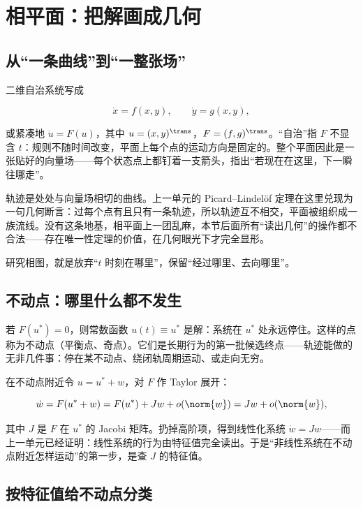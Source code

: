 \section{相平面：把解画成几何}

\subsection{从``一条曲线''到``一整张场''}

二维自治系统写成

\[
\dot x=f(x,y),
\qquad
\dot y=g(x,y),
\]

或紧凑地 \(\dot u=F(u)\)，其中 \(u=(x,y)^{\trans}\)，\(F=(f,g)^{\trans}\)。``自治''指 \(F\) 不显含 \(t\)：规则不随时间改变，平面上每个点的运动方向是固定的。整个平面因此是一张贴好的向量场——每个状态点上都钉着一支箭头，指出``若现在在这里，下一瞬往哪走''。

轨迹是处处与向量场相切的曲线。上一单元的 Picard--Lindelöf 定理在这里兑现为一句几何断言：过每个点有且只有一条轨迹，所以轨迹互不相交，平面被组织成一族流线。没有这条地基，相平面上一团乱麻，本节后面所有``读出几何''的操作都不合法——存在唯一性定理的价值，在几何眼光下才完全显形。

研究相图，就是放弃``\(t\) 时刻在哪里''，保留``经过哪里、去向哪里''。

\subsection{不动点：哪里什么都不发生}

若 \(F(u^\ast)=0\)，则常数函数 \(u(t)\equiv u^\ast\) 是解：系统在 \(u^\ast\) 处永远停住。这样的点称为不动点（平衡点、奇点）。它们是长期行为的第一批候选终点——轨迹能做的无非几件事：停在某不动点、绕闭轨周期运动、或走向无穷。

在不动点附近令 \(u=u^\ast+w\)，对 \(F\) 作 Taylor 展开：

\[
\dot w=F(u^\ast+w)=F(u^\ast)+Jw+o(\norm{w})=Jw+o(\norm{w}),
\]

其中 \(J\) 是 \(F\) 在 \(u^\ast\) 的 Jacobi 矩阵。扔掉高阶项，得到线性化系统 \(\dot w=Jw\)——而上一单元已经证明：线性系统的行为由特征值完全读出。于是``非线性系统在不动点附近怎样运动''的第一步，是查 \(J\) 的特征值。

\subsection{按特征值给不动点分类}


